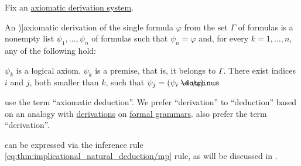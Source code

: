 \begin{definition}\label{def:axiomatic_derivation}
  Fix an \hyperref[def:axiomatic_derivation_system]{axiomatic derivation system}.

  An \term[ru=вывод (\cite[35]{Герасимов2011})]{axiomatic derivation} of the single formula \( \varphi \) from the set \( \Gamma \) of formulas is a nonempty list \( \psi_1, \ldots, \psi_n \) of formulas such that \( \psi_n = \varphi \) and, for every \( k = 1, \ldots, n \), any of the following hold:
  \begin{thmenum}
     \( \psi_k \) is a logical axiom.
     \( \psi_k \) is a premise, that is, it belongs to \( \Gamma \).
     There exist indices \( i \) and \( j \), both smaller than \( k \), such that \( \psi_j = (\psi_i \synimplies \psi_k) \).
  \end{thmenum}
\end{definition}
\begin{comments}
  \item {} use the term \enquote{axiomatic deduction}. We prefer \enquote{derivation} to \enquote{deduction} based on an analogy with \hyperref[def:formal_grammar/derivation]{derivations} on \hyperref[def:formal_grammar]{formal grammars}.  also prefer the term \enquote{derivation}.
  \item {} can be expressed via the inference rule \eqref{eq:thm:implicational_natural_deduction/mp} rule, as will be discussed in .
\end{comments}

